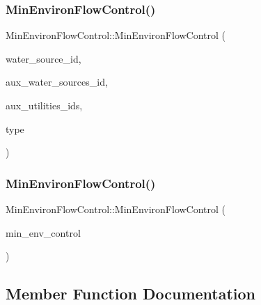 \subsubsection{\texorpdfstring{Min\+Environ\+Flow\+Control()}{MinEnvironFlowControl()}\hspace{0.1cm}{\footnotesize\ttfamily [1/2]}}
{\footnotesize\ttfamily Min\+Environ\+Flow\+Control\+::\+Min\+Environ\+Flow\+Control (\begin{DoxyParamCaption}\item[{int}]{water\+\_\+source\+\_\+id,  }\item[{const vector$<$ int $>$ \&}]{aux\+\_\+water\+\_\+sources\+\_\+id,  }\item[{const vector$<$ int $>$ \&}]{aux\+\_\+utilities\+\_\+ids,  }\item[{int}]{type }\end{DoxyParamCaption})}

\mbox{\label{classMinEnvironFlowControl_a274fc5217a2a79d9c488d903708f5e68}} 
\subsubsection{\texorpdfstring{Min\+Environ\+Flow\+Control()}{MinEnvironFlowControl()}\hspace{0.1cm}{\footnotesize\ttfamily [2/2]}}
{\footnotesize\ttfamily Min\+Environ\+Flow\+Control\+::\+Min\+Environ\+Flow\+Control (\begin{DoxyParamCaption}\item[{const \mbox{\hyperlink{classMinEnvironFlowControl}{Min\+Environ\+Flow\+Control}} \&}]{min\+\_\+env\+\_\+control }\end{DoxyParamCaption})}



\subsection{Member Function Documentation}
\mbox{\label{classMinEnvironFlowControl_a9dd9d33661f121dda9704288658ecf7e}} 
